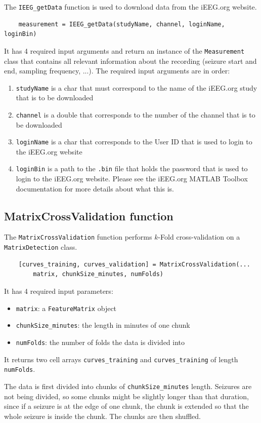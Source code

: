 \documentclass[usletter, 11pt]{extarticle}
\begin{document}
The \verb|IEEG_getData| function is used to download data from the iEEG.org website. 
\begin{Verbatim}
	measurement = IEEG_getData(studyName, channel, loginName, loginBin)
\end{Verbatim}
It has 4 required input arguments and return an instance of the \verb|Measurement| class that contains all relevant information about the recording (seizure start and end, sampling frequency, ...). The required input arguments are in order:
\begin{enumerate}
	\item \verb|studyName| is a char that must correspond to the name of the iEEG.org study that is to be downloaded
	\item \verb|channel| is a double that corresponds to the number of the channel that is to be downloaded
	\item \verb|loginName| is a char that corresponds to the User ID that is used to login to the iEEG.org website
	\item \verb|loginBin| is a path to the \verb|.bin| file that holds the password that is used to login to the iEEG.org website. Please see the iEEG.org MATLAB Toolbox documentation for more details about what this is.
\end{enumerate}

\subsection{MatrixCrossValidation function}

The \verb|MatrixCrossValidation| function performs $k$-Fold cross-validation on a \verb|MatrixDetection| class.

\begin{Verbatim}
	[curves_training, curves_validation] = MatrixCrossValidation(...
    	matrix, chunkSize_minutes, numFolds)
\end{Verbatim}
It has 4 required input parameters:
\begin{itemize}
	\item \verb|matrix|: a \verb|FeatureMatrix| object
	\item \verb|chunkSize_minutes|: the length in minutes of one chunk
	\item \verb|numFolds|: the number of folds the data is divided into
\end{itemize}
It returns two cell arrays \verb|curves_training| and \verb|curves_training| of length \verb|numFolds|. 

The data is first divided into chunks of \verb|chunkSize_minutes| length. Seizures are not being divided, so some chunks might be slightly longer than that duration, since if a seizure is at the edge of one chunk, the chunk is extended so that the whole seizure is inside the chunk. The chunks are then shuffled. 
\end{document}
